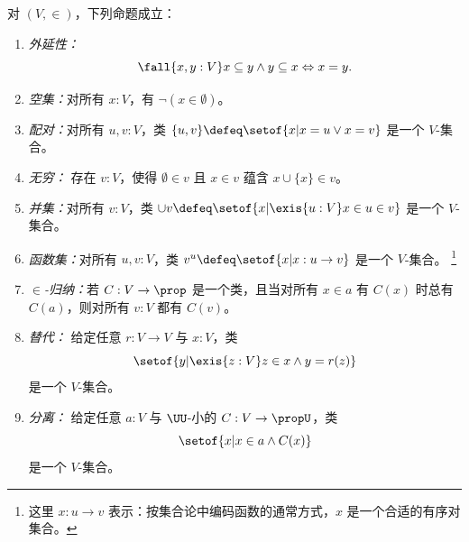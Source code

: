 \begin{thm}\label{thm:VisCST}
  对 $(V, {\in})$，下列命题成立：
  \begin{enumerate}
  \item \emph{外延性：}
    \begin{equation*}
      \fall{x, y : V} x \subseteq y \land y \subseteq x \Leftrightarrow x = y.
    \end{equation*}
     \item \emph{空集：}对所有 $x:V$，有 $\neg (x\in \emptyset)$。
    \item \emph{配对：}对所有 $u, v:V$，类 $\{u, v\} \defeq \setof{ x | x = u \vee x = v}$ 是一个 $V$-集合。
    \item \emph{无穷：} 存在 $v:V$，使得 $\emptyset\in v$ 且 $x\in v$ 蕴含 $x\cup \{x\}\in v$。
  \item \emph{并集：}对所有 $v:V$，类 $\cup v\defeq \setof{ x | \exis{u:V} x \in u \in v}$ 是一个 $V$-集合。
    \item \emph{函数集：}对所有 $u, v:V$，类 $v^u \defeq \setof{ x | x : u\to v}$ 是一个 $V$-集合。%
      \footnote{这里 $x:u\to v$ 表示：按集合论中编码函数的通常方式，$x$ 是一个合适的有序对集合。}
   \item \emph{$\in$-归纳：}若 $C : V \to \prop$ 是一个类，且当对所有 $x\in a$ 有 $C(x)$ 时总有 $C(a)$，则对所有 $v:V$ 都有 $C(v)$。
     \item \emph{替代：} 给定任意 $r : V \to V$ 与 $x : V$，类
       \begin{equation*}
         \setof{ y | \exis{z : V} z \in x \land y = r(z)}
       \end{equation*}
       是一个 $V$-集合。
   \item \emph{分离：} 给定任意 $a : V$ 与 $\UU$-小的 $C : V \to \propU$，类
     \begin{equation*}
       \setof{ x | x \in a \land C(x)}
     \end{equation*}
     是一个 $V$-集合。
  \end{enumerate}
\end{thm}


